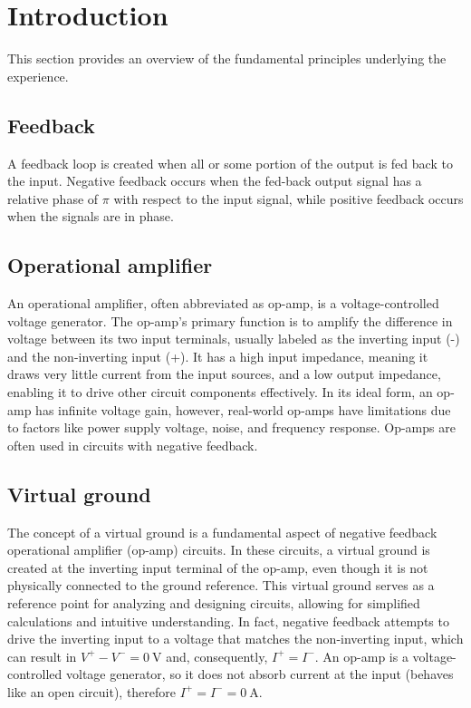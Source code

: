 \section{Introduction}
This section provides an overview of the fundamental principles underlying the experience.

	\subsection{Feedback}
		A feedback loop is created when all or some portion of the output is fed back to the input. 
		Negative feedback occurs when the fed-back output signal has a relative phase of $\pi$ with respect to the input signal, 
		while positive feedback occurs when the signals are in phase.
	
	\subsection{Operational amplifier}
		An operational amplifier, often abbreviated as op-amp, is a voltage-controlled voltage generator.
		The op-amp's primary function is to amplify the difference in voltage between its two input terminals, usually labeled as the inverting input (-) and the non-inverting input (+). 
		It has a high input impedance, meaning it draws very little current from the input sources, and a low output impedance, enabling it to drive other circuit components effectively. 
		In its ideal form, an op-amp has infinite voltage gain, however, real-world op-amps have limitations due to factors like power supply voltage, noise, and frequency response. 
		Op-amps are often used in circuits with negative feedback.
	
	\subsection{Virtual ground}
		The concept of a virtual ground is a fundamental aspect of negative feedback operational amplifier (op-amp) circuits. 
		In these circuits, a virtual ground is created at the inverting input terminal of the op-amp, even though it is not physically connected to the ground reference. 
		This virtual ground serves as a reference point for analyzing and designing circuits, allowing for simplified calculations and intuitive understanding.
		In fact, negative feedback attempts to drive the inverting input to a voltage that matches the non-inverting input, which can result in $V^+ - V^- = \SI{0}{\volt}$ and, consequently, $I^+ = I^-$.
		An op-amp is a voltage-controlled voltage generator, so it does not absorb current at the input (behaves like an open circuit), therefore $I^+ = I^- = \SI{0}{\ampere}$. 

